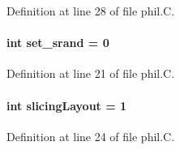 Definition at line 28 of file phil.C.\label{phil.C_a9}
\paragraph{\setlength{\rightskip}{0pt plus 5cm}int set\_\-srand = 0}\hfill



Definition at line 21 of file phil.C.\label{phil.C_a11}
\paragraph{\setlength{\rightskip}{0pt plus 5cm}int slicing\-Layout = 1}\hfill



Definition at line 24 of file phil.C.